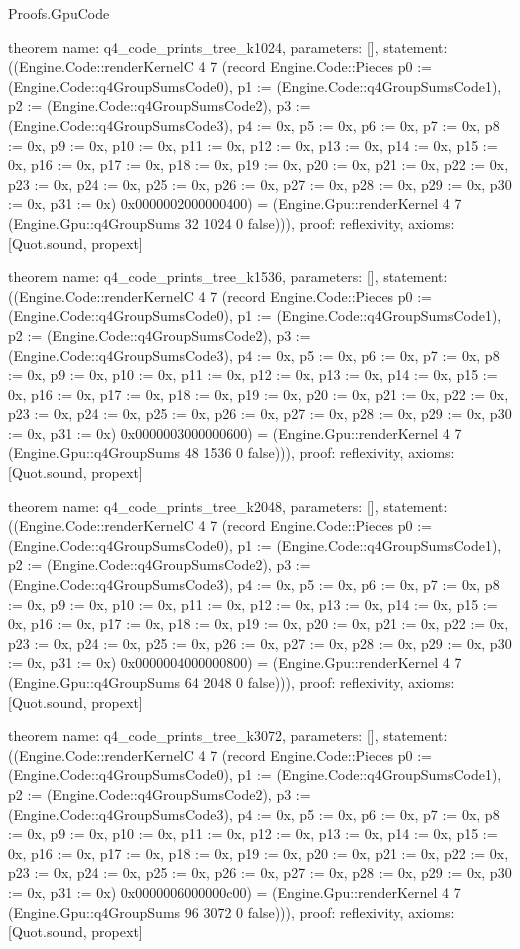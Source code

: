 \begin{lexlean}{Proofs.GpuCode}
\begin{semanticmodule}
theorem{
  name: q4_code_prints_tree_k1024,
  parameters: [],
  statement: ((Engine.Code::renderKernelC 4 7 (record Engine.Code::Pieces {p0 := (Engine.Code::q4GroupSumsCode0), p1 := (Engine.Code::q4GroupSumsCode1), p2 := (Engine.Code::q4GroupSumsCode2), p3 := (Engine.Code::q4GroupSumsCode3), p4 := 0x, p5 := 0x, p6 := 0x, p7 := 0x, p8 := 0x, p9 := 0x, p10 := 0x, p11 := 0x, p12 := 0x, p13 := 0x, p14 := 0x, p15 := 0x, p16 := 0x, p17 := 0x, p18 := 0x, p19 := 0x, p20 := 0x, p21 := 0x, p22 := 0x, p23 := 0x, p24 := 0x, p25 := 0x, p26 := 0x, p27 := 0x, p28 := 0x, p29 := 0x, p30 := 0x, p31 := 0x}) 0x0000002000000400) = (Engine.Gpu::renderKernel 4 7 (Engine.Gpu::q4GroupSums 32 1024 0 false))),
  proof: reflexivity{},
  axioms: [Quot.sound, propext]
}

theorem{
  name: q4_code_prints_tree_k1536,
  parameters: [],
  statement: ((Engine.Code::renderKernelC 4 7 (record Engine.Code::Pieces {p0 := (Engine.Code::q4GroupSumsCode0), p1 := (Engine.Code::q4GroupSumsCode1), p2 := (Engine.Code::q4GroupSumsCode2), p3 := (Engine.Code::q4GroupSumsCode3), p4 := 0x, p5 := 0x, p6 := 0x, p7 := 0x, p8 := 0x, p9 := 0x, p10 := 0x, p11 := 0x, p12 := 0x, p13 := 0x, p14 := 0x, p15 := 0x, p16 := 0x, p17 := 0x, p18 := 0x, p19 := 0x, p20 := 0x, p21 := 0x, p22 := 0x, p23 := 0x, p24 := 0x, p25 := 0x, p26 := 0x, p27 := 0x, p28 := 0x, p29 := 0x, p30 := 0x, p31 := 0x}) 0x0000003000000600) = (Engine.Gpu::renderKernel 4 7 (Engine.Gpu::q4GroupSums 48 1536 0 false))),
  proof: reflexivity{},
  axioms: [Quot.sound, propext]
}

theorem{
  name: q4_code_prints_tree_k2048,
  parameters: [],
  statement: ((Engine.Code::renderKernelC 4 7 (record Engine.Code::Pieces {p0 := (Engine.Code::q4GroupSumsCode0), p1 := (Engine.Code::q4GroupSumsCode1), p2 := (Engine.Code::q4GroupSumsCode2), p3 := (Engine.Code::q4GroupSumsCode3), p4 := 0x, p5 := 0x, p6 := 0x, p7 := 0x, p8 := 0x, p9 := 0x, p10 := 0x, p11 := 0x, p12 := 0x, p13 := 0x, p14 := 0x, p15 := 0x, p16 := 0x, p17 := 0x, p18 := 0x, p19 := 0x, p20 := 0x, p21 := 0x, p22 := 0x, p23 := 0x, p24 := 0x, p25 := 0x, p26 := 0x, p27 := 0x, p28 := 0x, p29 := 0x, p30 := 0x, p31 := 0x}) 0x0000004000000800) = (Engine.Gpu::renderKernel 4 7 (Engine.Gpu::q4GroupSums 64 2048 0 false))),
  proof: reflexivity{},
  axioms: [Quot.sound, propext]
}

theorem{
  name: q4_code_prints_tree_k3072,
  parameters: [],
  statement: ((Engine.Code::renderKernelC 4 7 (record Engine.Code::Pieces {p0 := (Engine.Code::q4GroupSumsCode0), p1 := (Engine.Code::q4GroupSumsCode1), p2 := (Engine.Code::q4GroupSumsCode2), p3 := (Engine.Code::q4GroupSumsCode3), p4 := 0x, p5 := 0x, p6 := 0x, p7 := 0x, p8 := 0x, p9 := 0x, p10 := 0x, p11 := 0x, p12 := 0x, p13 := 0x, p14 := 0x, p15 := 0x, p16 := 0x, p17 := 0x, p18 := 0x, p19 := 0x, p20 := 0x, p21 := 0x, p22 := 0x, p23 := 0x, p24 := 0x, p25 := 0x, p26 := 0x, p27 := 0x, p28 := 0x, p29 := 0x, p30 := 0x, p31 := 0x}) 0x0000006000000c00) = (Engine.Gpu::renderKernel 4 7 (Engine.Gpu::q4GroupSums 96 3072 0 false))),
  proof: reflexivity{},
  axioms: [Quot.sound, propext]
}


\end{semanticmodule}
\end{lexlean}
